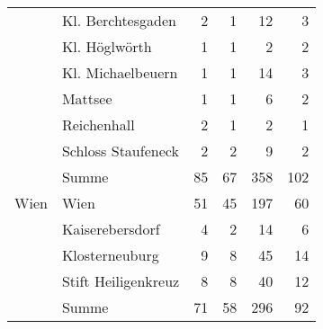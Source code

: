 \begin{xltabular}{\textwidth}{X l R R R R}
	& Kl. Berchtesgaden
	& 2
	& 1
	& 12
	& 3
	\\

	& Kl. Höglwörth
	& 1
	& 1
	& 2
	& 2
	\\

	& Kl. Michaelbeuern
	& 1
	& 1
	& 14
	& 3
	\\

	& Mattsee
	& 1
	& 1
	& 6
	& 2
	\\

	& Reichenhall
	& 2
	& 1
	& 2
	& 1
	\\

	& Schloss Staufeneck
	& 2
	& 2
	& 9
	& 2
	\\


	& Summe
	& 85
	& 67
	& 358
	& 102
	\\

\midrule

Wien
	& Wien
	& 51
	& 45
	& 197
	& 60
	\\

	& Kaiserebersdorf
	& 4
	& 2
	& 14
	& 6
	\\

	& Klosterneuburg
	& 9
	& 8
	& 45
	& 14
	\\

	& Stift Heiligenkreuz
	& 8
	& 8
	& 40
	& 12
	\\


	& Summe
	& 71
	& 58
	& 296
	& 92
	\\

\end{xltabular}
